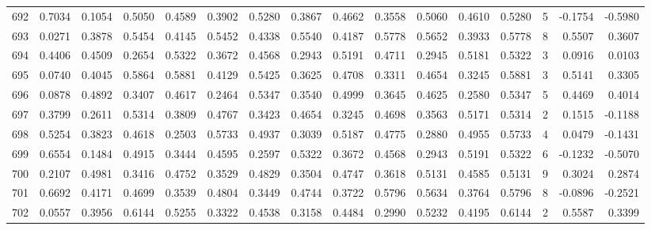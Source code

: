 \begin{tabular}{lrrrrrrrrrrrrrrr}
692 &      0.7034 &  0.1054 &  0.5050 &  0.4589 &  0.3902 &  0.5280 &  0.3867 &  0.4662 &  0.3558 &  0.5060 &   0.4610 &     0.5280 &      5 &                   -0.1754 &                    -0.5980 \\
693 &      0.0271 &  0.3878 &  0.5454 &  0.4145 &  0.5452 &  0.4338 &  0.5540 &  0.4187 &  0.5778 &  0.5652 &   0.3933 &     0.5778 &      8 &                    0.5507 &                     0.3607 \\
694 &      0.4406 &  0.4509 &  0.2654 &  0.5322 &  0.3672 &  0.4568 &  0.2943 &  0.5191 &  0.4711 &  0.2945 &   0.5181 &     0.5322 &      3 &                    0.0916 &                     0.0103 \\
695 &      0.0740 &  0.4045 &  0.5864 &  0.5881 &  0.4129 &  0.5425 &  0.3625 &  0.4708 &  0.3311 &  0.4654 &   0.3245 &     0.5881 &      3 &                    0.5141 &                     0.3305 \\
696 &      0.0878 &  0.4892 &  0.3407 &  0.4617 &  0.2464 &  0.5347 &  0.3540 &  0.4999 &  0.3645 &  0.4625 &   0.2580 &     0.5347 &      5 &                    0.4469 &                     0.4014 \\
697 &      0.3799 &  0.2611 &  0.5314 &  0.3809 &  0.4767 &  0.3423 &  0.4654 &  0.3245 &  0.4698 &  0.3563 &   0.5171 &     0.5314 &      2 &                    0.1515 &                    -0.1188 \\
698 &      0.5254 &  0.3823 &  0.4618 &  0.2503 &  0.5733 &  0.4937 &  0.3039 &  0.5187 &  0.4775 &  0.2880 &   0.4955 &     0.5733 &      4 &                    0.0479 &                    -0.1431 \\
699 &      0.6554 &  0.1484 &  0.4915 &  0.3444 &  0.4595 &  0.2597 &  0.5322 &  0.3672 &  0.4568 &  0.2943 &   0.5191 &     0.5322 &      6 &                   -0.1232 &                    -0.5070 \\
700 &      0.2107 &  0.4981 &  0.3416 &  0.4752 &  0.3529 &  0.4829 &  0.3504 &  0.4747 &  0.3618 &  0.5131 &   0.4585 &     0.5131 &      9 &                    0.3024 &                     0.2874 \\
701 &      0.6692 &  0.4171 &  0.4699 &  0.3539 &  0.4804 &  0.3449 &  0.4744 &  0.3722 &  0.5796 &  0.5634 &   0.3764 &     0.5796 &      8 &                   -0.0896 &                    -0.2521 \\
702 &      0.0557 &  0.3956 &  0.6144 &  0.5255 &  0.3322 &  0.4538 &  0.3158 &  0.4484 &  0.2990 &  0.5232 &   0.4195 &     0.6144 &      2 &                    0.5587 &                     0.3399 \\

\end{tabular}
